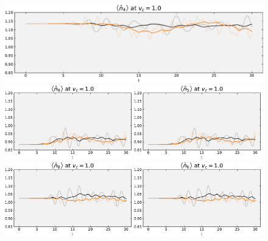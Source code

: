 \begin{figure}[!hbt]
{{\begin{minipage}[b]{.59\textwidth}
                \includegraphics[trim=0 0 0 -4, clip, width=1.00\textwidth]{graph/occupation/occupation_site_4_vc_10.pdf}
                \includegraphics[trim=0 0 0 -4, clip, width=0.49\textwidth]{graph/occupation/occupation_site_9_vc_10.pdf}
                \includegraphics[trim=0 0 0 -4, clip, width=0.49\textwidth]{graph/occupation/occupation_site_5_vc_10.pdf}
                \includegraphics[trim=0 0 0 -4, clip, width=0.49\textwidth]{graph/occupation/occupation_site_8_vc_10.pdf}
                \includegraphics[trim=0 0 0 -4, clip, width=0.49\textwidth]{graph/occupation/occupation_site_6_vc_10.pdf}

\end{minipage}}}
\end{figure}
